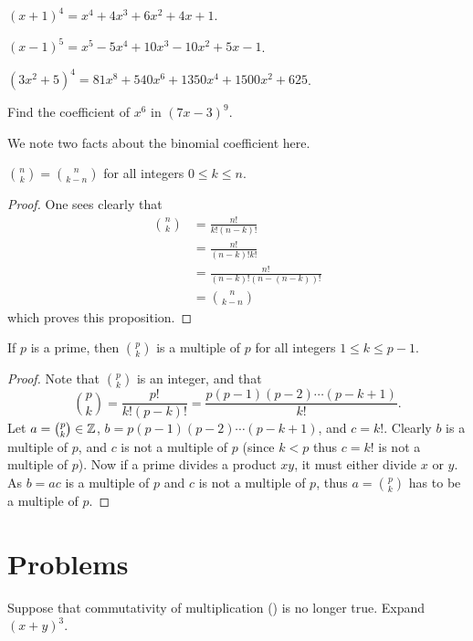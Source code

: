 \begin{example}
    $(x+1)^4 = x^4 + 4x^3 + 6x^2 + 4x + 1$.
\end{example}
\begin{example}
    $(x-1)^5 = x^5 - 5x^4 + 10x^3 - 10x^2 + 5x - 1$.
\end{example}
\begin{example}
    $(3x^2 + 5)^4 = 81x^8 + 540x^6 + 1350x^4 + 1500x^2 + 625$.
\end{example}

\begin{exercise}
    Find the coefficient of $x^6$ in $(7x-3)^9$.
\end{exercise}

We note two facts about the binomial coefficient here.
\begin{proposition}
    ${n\choose k} = {n\choose {k-n}}$ for all integers $0 \leq k \leq n$.
\end{proposition}
\begin{proof}
    One sees clearly that
    \begin{align*}
        {n\choose k} &= \frac{n!}{k!(n-k)!}\\
        &= \frac{n!}{(n-k)!k!}\\
        &= \frac{n!}{(n-k)!(n-(n-k))!}\\
        &= {n\choose {k-n}}
    \end{align*}
    which proves this proposition.
\end{proof}

\begin{proposition}\label{prop-binomial-coefficient-multiple-of-p}
    If $p$ is a prime, then $p\choose k$ is a multiple of $p$ for all integers $1 \leq k \leq p - 1$.
\end{proposition}
\begin{proof}
    Note that $p \choose k$ is an integer, and that
    \[
        {p \choose k} = \frac{p!}{k!(p-k)!} = \frac{p(p-1)(p-2)\cdots(p-k+1)}{k!}.
    \]
    Let $a = {p \choose k} \in \mathbb{Z}$, $b = p(p-1)(p-2)\cdots(p-k+1)$, and $c = k!$. Clearly $b$ is a multiple of $p$, and $c$ is not a multiple of $p$ (since $k < p$ thus $c = k!$ is not a multiple of $p$). Now if a prime divides a product $xy$, it must either divide $x$ or $y$. As $b = ac$ is a multiple of $p$ and $c$ is not a multiple of $p$, thus $a = {p \choose k}$ has to be a multiple of $p$.
\end{proof}

\newpage

\section{Problems}
\begin{problem}
    Suppose that commutativity of multiplication () is no longer true. Expand $(x+y)^3$.
\end{problem}

